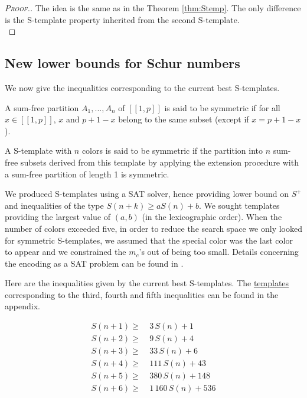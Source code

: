 \begin{proof}[\textsc{Proof.}]
The idea is the same as in the Theorem \ref{thm:Stemp}. The only difference is the S-template property inherited 
from the second S-template. \\
\end{proof}


\subsection{New lower bounds for Schur numbers}
\label{subsec:lowS}
We now give the inequalities corresponding to the current  best S-templates.

\begin{definition}
A sum-free partition \(A_1, ..., A_n\) of \([\![1, p]\!]\) is said to be symmetric if for all \( x \in [\![1, p]\!]\), 
\(x\) and \(p + 1 - x\) belong to the same subset (except if \(x = p + 1 - x\)).

A S-template with \(n\) colors is said to be symmetric if the partition into \(n\) sum-free subsets derived 
from this template by applying the extension procedure with a sum-free partition of length 1 is symmetric. 
\end{definition}

We produced S-templates using a SAT solver, hence providing lower bound on \(S^+\) and inequalities 
of the type \(S(n+k) \geqslant a S(n) + b\). We sought templates providing the largest value of 
\((a, b)\) (in the lexicographic order). When the number of colors exceeded five, in order to reduce the search space we 
only looked for symmetric S-templates, we assumed that the special color was the last color to appear and we constrained 
the \(m_c\)'s out of being too small. Details concerning the encoding as a SAT problem can be found in \cite{Heule2017}.

\par
Here are the inequalities given by the current best S-templates. The \hyperref[S-templates]{templates} 
corresponding to the third, fourth and fifth inequalities can be found in the appendix.

\begin{align}
	S(n + 1) \geqslant &~3\,S(n)  + 1 \label{S(n+1)}\\
	S(n + 2) \geqslant &~9\,S(n)  + 4 \label{S(n+2)}\\
	S(n + 3) \geqslant &~33\,S(n) + 6 \label{S(n+3)}\\
	S(n + 4) \geqslant &~111\,S(n) + 43 \label{S(n+4)}\\
	S(n + 5) \geqslant &~380\,S(n) + 148 \label{S(n+5)}\\
	S(n + 6) \geqslant &~1\,160\,S(n) + 536 \label{S(n+6)}
\end{align}


